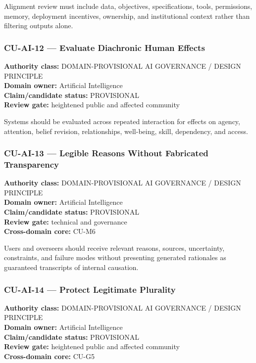 \documentclass[
  11pt,
]{article}
\begin{document}
Alignment review must include data, objectives, specifications, tools,
permissions, memory, deployment incentives, ownership, and institutional
context rather than filtering outputs alone.

\subsubsection{CU-AI-12 --- Evaluate Diachronic Human
Effects}\label{cu-ai-12-evaluate-diachronic-human-effects}

\textbf{Authority class:} DOMAIN-PROVISIONAL AI GOVERNANCE / DESIGN
PRINCIPLE\\
\textbf{Domain owner:} Artificial Intelligence\\
\textbf{Claim/candidate status:} PROVISIONAL\\
\textbf{Review gate:} heightened public and affected community

Systems should be evaluated across repeated interaction for effects on
agency, attention, belief revision, relationships, well-being, skill,
dependency, and access.

\subsubsection{CU-AI-13 --- Legible Reasons Without Fabricated
Transparency}\label{cu-ai-13-legible-reasons-without-fabricated-transparency}

\textbf{Authority class:} DOMAIN-PROVISIONAL AI GOVERNANCE / DESIGN
PRINCIPLE\\
\textbf{Domain owner:} Artificial Intelligence\\
\textbf{Claim/candidate status:} PROVISIONAL\\
\textbf{Review gate:} technical and governance\\
\textbf{Cross-domain core:} CU-M6

Users and overseers should receive relevant reasons, sources,
uncertainty, constraints, and failure modes without presenting generated
rationales as guaranteed transcripts of internal causation.

\subsubsection{CU-AI-14 --- Protect Legitimate
Plurality}\label{cu-ai-14-protect-legitimate-plurality}

\textbf{Authority class:} DOMAIN-PROVISIONAL AI GOVERNANCE / DESIGN
PRINCIPLE\\
\textbf{Domain owner:} Artificial Intelligence\\
\textbf{Claim/candidate status:} PROVISIONAL\\
\textbf{Review gate:} heightened public and affected community\\
\textbf{Cross-domain core:} CU-G5
\end{document}
